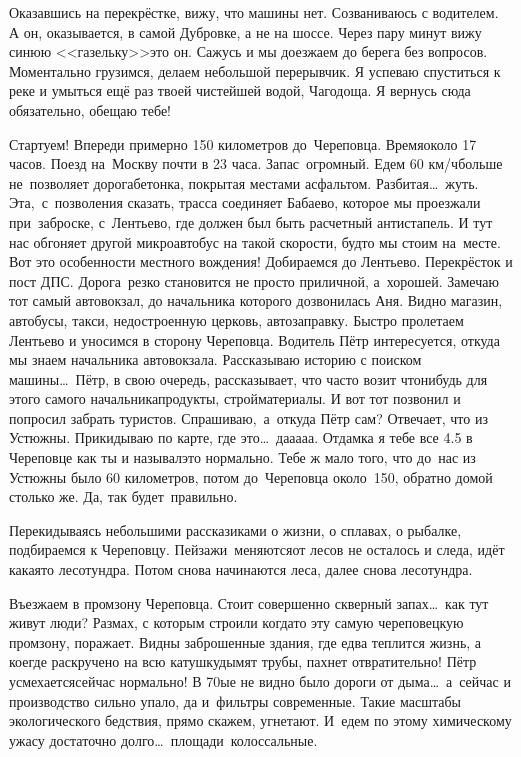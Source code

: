Оказавшись на перекрёстке, вижу, что машины нет. Созваниваюсь с водителем. А он, оказывается, в самой Дубровке, а не на шоссе. Через пару минут вижу синюю <<газельку>>\mdash это он. Сажусь и мы доезжаем до берега без вопросов. Моментально грузимся, делаем небольшой перерывчик. Я успеваю спуститься к реке и умыться ещё раз твоей чистейшей водой, Чагодоща. Я вернусь сюда обязательно, обещаю тебе!

Стартуем! Впереди примерно 150 километров до~Череповца. Время\mdash около 17 часов. Поезд на~Москву почти в 23 часа. Запас~огромный. Едем 60 км/ч\mdash больше не~позволяет дорога\mdash бетонка, покрытая местами асфальтом. Разбитая\ldots~жуть. Эта,~с~позволения сказать, трасса соединяет Бабаево, которое мы проезжали при~заброске, с~Лентьево, где должен был быть расчетный антистапель. И тут нас обгоняет другой микроавтобус на такой скорости, будто мы стоим на~месте. Вот это особенности местного вождения! 
\newpage
Добираемся до Лентьево. Перекрёсток и пост ДПС. Дорога~резко становится не просто приличной, а~хорошей. Замечаю тот самый автовокзал, до начальника которого дозвонилась Аня. Видно магазин, автобусы, такси, недостроенную церковь, автозаправку. Быстро пролетаем Лентьево и уносимся в сторону Череповца. Водитель Пётр интересуется, откуда мы знаем начальника автовокзала. Рассказываю историю с поиском машины\ldots~Пётр, в свою очередь, рассказывает, что часто возит что\sdash нибудь для этого самого начальника\mdash продукты, стройматериалы. И вот тот позвонил и попросил забрать туристов. Спрашиваю,~а~откуда Пётр сам? Отвечает, что из Устюжны. Прикидываю по карте, где это\ldots~да\sdash а\sdash а\sdash а\sdash а. Отдам\sdash ка я тебе все 4.5 в Череповце как ты и называл\mdash это нормально. Тебе ж мало того, что до~нас из Устюжны было 60 километров, потом до~Череповца около~150, обратно домой столько же. Да, так будет~правильно. 

Перекидываясь небольшими рассказиками о жизни, о сплавах, о рыбалке, подбираемся к Череповцу. Пейзажи~меняются\mdash от лесов не осталось и следа, идёт какая\sdash то лесотундра. Потом снова начинаются леса, далее снова лесотундра. 

Въезжаем в промзону Череповца. Стоит совершенно скверный запах\ldots~как тут живут люди? Размах, с которым строили когда\sdash то эту самую череповецкую промзону, поражает. Видны заброшенные здания, где едва теплится жизнь, а кое\sdash где раскручено на всю катушку\mdash дымят трубы, пахнет отвратительно! Пётр усмехается\mdash сейчас нормально! В 70\sdash ые не видно было дороги от дыма\ldots~а~сейчас и производство сильно упало, да и~фильтры современные. Такие масштабы экологического бедствия, прямо скажем, угнетают. И~едем по этому химическому ужасу достаточно долго\ldots~площади~колоссальные.

